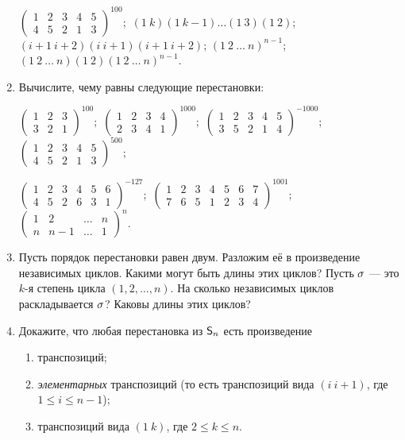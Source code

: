 \begin{enumerate}
\noindent\ipunkt $\displaystyle\begin{pmatrix}1&2&3&4&5\\4&5&2&1&3\end{pmatrix}^{100};$
\ipunkt $(1\ k)(1\ k-1)\ldots (1\ 3)(1\ 2)$;
\ipunkt $(i+1\ i+2)(i\ i+1)(i+1\ i+2)$;
\ipunkt $(1\ 2\ \ldots\ n)^{n-1}$;
\ipunkt $(1\ 2\ \ldots\ n)(1\ 2)(1\ 2\ \ldots\ n)^{n-1}$.


\item Вычислите, чему равны следующие перестановки:

\noindent\ipunkt $\displaystyle\begin{pmatrix}1&2&3\\3&2&1\end{pmatrix}^{100};$
\ipunkt $\displaystyle\begin{pmatrix}1&2&3&4\\2&3&4&1\end{pmatrix}^{1000};$
\ipunkt $\displaystyle\begin{pmatrix}1&2&3&4&5\\3&5&2&1&4\end{pmatrix}^{-1000};$
\ipunkt $\displaystyle\begin{pmatrix}1&2&3&4&5\\4&5&2&1&3\end{pmatrix}^{500};$

\noindent\ipunkt $\displaystyle\begin{pmatrix}1&2&3&4&5&6\\4&5&2&6&3&1\end{pmatrix}^{-127};$
\ipunkt $\displaystyle\begin{pmatrix}1&2&3&4&5&6&7\\7&6&5&1&2&3&4\end{pmatrix}^{1001};$
\ipunkt $\displaystyle\begin{pmatrix}1&2&\dots &n\\n&n-1&\dots &1\end{pmatrix}^{n}.$



\item \ipunkt Пусть порядок перестановки равен двум. Разложим её в
произведение независимых циклов. Какими могут быть длины этих
циклов? \ipunkt Пусть $\sigma$ --- это $k$-я степень цикла $(1, 2, \dots , n)$. На сколько
независимых циклов раскладывается $\sigma$? Каковы длины этих циклов?

\item \label{transp}Докажите, что любая перестановка из ${\mathsf{S}}_n$ есть произведение
\begin{enumerate}
\item транспозиций;
\item {\em элементарных} транспозиций (то есть транспозиций вида $(i\ i+1)$, где $1\leq i\leq n-1$);
\item транспозиций вида $(1\ k)$, где $2\leq k\leq n$.
\end{enumerate}



\end{enumerate}
